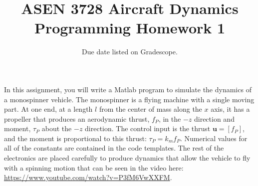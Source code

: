 \documentclass{article}
\title{ASEN 3728 Aircraft Dynamics\\Programming Homework 1}
\date{Due date listed on Gradescope.}
\theoremstyle{definition}
\begin{document}
\maketitle

In this assignment, you will write a Matlab program to simulate the dynamics of a monospinner vehicle\cite{weixuan_zhang_controllable_2016}. The monospinner is a flying machine with a single moving part. At one end, at a length $l$ from the center of mass along the $x$ axis, it has a propeller that produces an aerodynamic thrust, $f_P$, in the $-z$ direction and moment, $\tau_P$ about the $-z$ direction. The control input is the thrust $\textbf{u} = [f_P]$, and the moment is proportional to this thrust: $\tau_P = k_m f_P$. Numerical values for all of the constants are contained in the code templates. The rest of the electronics are placed carefully to produce dynamics that allow the vehicle to fly with a spinning motion that can be seen in the video here: \url{https://www.youtube.com/watch?v=P3fM6VwXXFM}.
\end{document}

